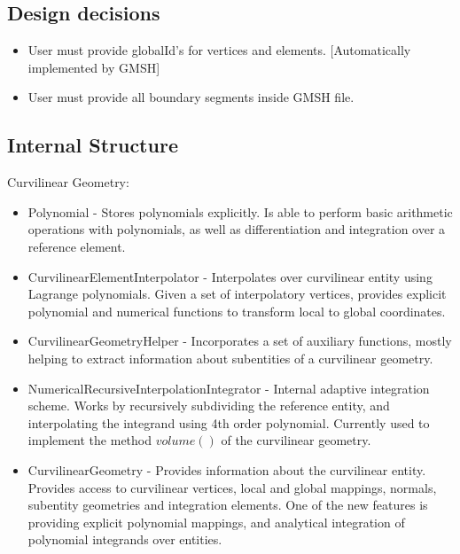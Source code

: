 \subsection{Design decisions}
\label{section-outline-designdecisions}

\begin{itemize}
	\item User must provide globalId's for vertices and elements. [Automatically implemented by GMSH]
	\item User must provide all boundary segments inside GMSH file.
\end{itemize}


\subsection{Internal Structure}
\label{section-outline-internalstructure}


Curvilinear Geometry:
\begin{itemize}
	\item Polynomial - Stores polynomials explicitly. Is able to perform basic arithmetic operations with polynomials, as well as differentiation and integration over a reference element.
	\item CurvilinearElementInterpolator - Interpolates over curvilinear entity using Lagrange polynomials. Given a set of interpolatory vertices, provides explicit polynomial and numerical functions to transform local to global coordinates.
	\item CurvilinearGeometryHelper - Incorporates a set of auxiliary functions, mostly helping to extract information about subentities of a curvilinear geometry.
	\item NumericalRecursiveInterpolationIntegrator - Internal adaptive integration scheme. Works by recursively subdividing the reference entity, and interpolating the integrand using 4th order polynomial. Currently used to implement the method $volume()$ of the curvilinear geometry.
	\item CurvilinearGeometry - Provides information about the curvilinear entity. Provides access to curvilinear vertices, local and global mappings, normals, subentity geometries and integration elements. One of the new features is providing explicit polynomial mappings, and analytical integration of polynomial integrands over entities.
\end{itemize}

